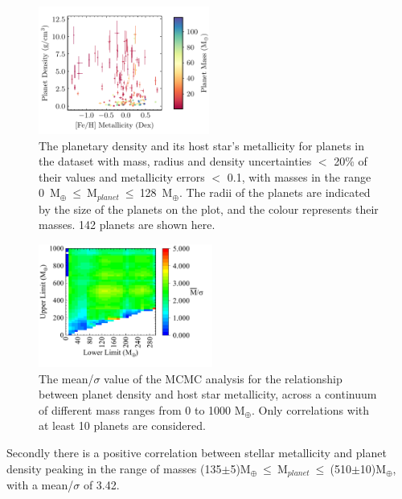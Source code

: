 \documentclass[a4paper,twocolumn,12pt]{article}
\begin{document}
\begin{figure}[h!]
    \centering
    \includegraphics[width=0.5\textwidth]{Graphs/FeH vs Density Planet Plot Mass 0 to 128.pdf}
    \caption{The planetary density and its host star's metallicity for planets in the dataset with mass, radius and density uncertainties $<$ 20\% of their values and metallicity errors $<$ 0.1, with masses in the range 0~M$_{\oplus}~\leq~$M$_{planet}~\leq~$128~M$_{\oplus}$. The radii of the planets are indicated by the size of the planets on the plot, and the colour represents their masses. 142 planets are shown here.}
    \label{figure: Fe/H vs Density correlations - Mass range small boys}
\end{figure}


\begin{figure}[h!]
    \centering
    \includegraphics[width=0.51\textwidth]{Graphs/FeH vs Density correlations - Mass ranges (0 to 1000).pdf}
    \caption{The mean/$\sigma$ value of the MCMC analysis for the relationship between planet density and host star metallicity, across a continuum of different mass ranges from 0 to 1000 M$_\oplus$. Only correlations with at least 10 planets are considered.}
    \label{figure: Fe/H vs Density correlations - Mass ranges (0 to 1000)}
\end{figure}

Secondly there is a positive correlation between stellar metallicity and planet density peaking in the range of masses (135$\pm$5)M$_{\oplus}~\leq~$M$_{planet}~\leq~$(510$\pm$10)M$_{\oplus}$, with a mean/$\sigma$ of 3.42.
\end{document}
